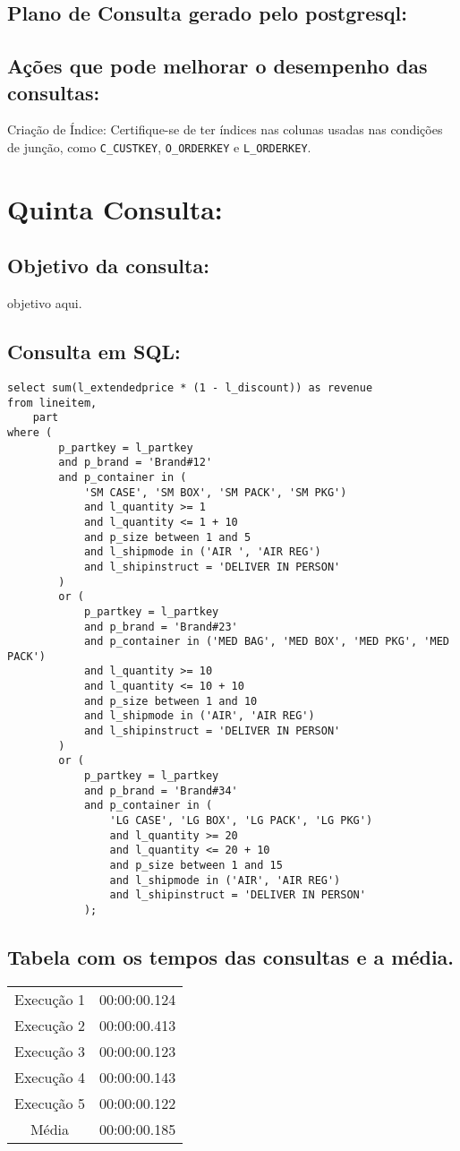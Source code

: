 \documentclass[12pt]{article}
\begin{document}
\begin{landscape}
\subsection{Plano de Consulta gerado pelo postgresql:}

\subsection{Ações que pode melhorar o desempenho das 
consultas:} Criação de Índice: Certifique-se de ter índices nas colunas usadas nas condições de junção, como \texttt{C\_CUSTKEY}, \texttt{O\_ORDERKEY} e \texttt{L\_ORDERKEY}.
\section{Quinta Consulta:}


\subsection{Objetivo da consulta:}
objetivo aqui.
\subsection{Consulta em SQL:}
\begin{lstlisting}
select sum(l_extendedprice * (1 - l_discount)) as revenue
from lineitem,
	part
where (
		p_partkey = l_partkey
		and p_brand = 'Brand#12'
		and p_container in (
			'SM CASE', 'SM BOX', 'SM PACK', 'SM PKG')
			and l_quantity >= 1
			and l_quantity <= 1 + 10
			and p_size between 1 and 5
			and l_shipmode in ('AIR ', 'AIR REG')
			and l_shipinstruct = 'DELIVER IN PERSON'
		)
		or (
			p_partkey = l_partkey
			and p_brand = 'Brand#23'
			and p_container in ('MED BAG', 'MED BOX', 'MED PKG', 'MED PACK')
			and l_quantity >= 10
			and l_quantity <= 10 + 10
			and p_size between 1 and 10
			and l_shipmode in ('AIR', 'AIR REG')
			and l_shipinstruct = 'DELIVER IN PERSON'
		)
		or (
			p_partkey = l_partkey
			and p_brand = 'Brand#34'
			and p_container in (
				'LG CASE', 'LG BOX', 'LG PACK', 'LG PKG')
				and l_quantity >= 20
				and l_quantity <= 20 + 10
				and p_size between 1 and 15
				and l_shipmode in ('AIR', 'AIR REG')
				and l_shipinstruct = 'DELIVER IN PERSON'
			);
\end{lstlisting}

\subsection{Tabela com os tempos das consultas e a média.}
\begin{tabular}{|c|c|}
  \hline
  Execução 1 & 00:00:00.124 \\
  Execução 2 & 00:00:00.413 \\
  Execução 3 & 00:00:00.123 \\
  Execução 4 & 00:00:00.143 \\
  Execução 5 & 00:00:00.122 \\
  \hline
  Média & 00:00:00.185 \\
  \hline
\end{tabular}


\end{landscape}
\end{document}
